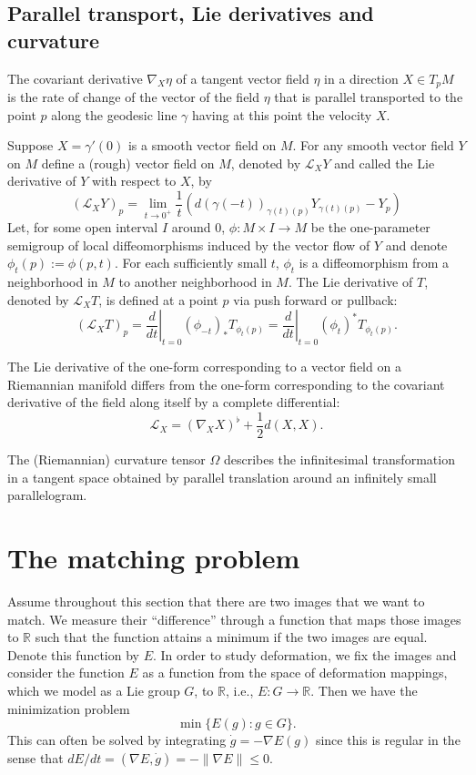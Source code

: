 \documentclass{article}
\theoremstyle{plain}
\theoremstyle{definition}
\numberwithin{equation}{section}
\newcommand{\R}{\ensuremath{\mathbb{R}}}
\newcommand{\lie}{\ensuremath{\mathcal{L}}}
\begin{document}
\subsection{Parallel transport, Lie derivatives and curvature}

The covariant derivative $\nabla_X\eta$ of a tangent vector field $\eta$ in a
direction $X\in T_pM$ is the rate of change of the vector of the field $\eta$ that is parallel transported to the point $p$ along the geodesic line $\gamma$ having at this point the velocity $X$.

Suppose $X=\gamma'(0)$ is a smooth vector field on $M$. %
For any smooth vector field $Y$ on $M$ define a (rough) vector field on $M$, denoted by $\lie_XY$ and called the Lie derivative of $Y$ with respect to $X$, by
\[
(\lie_XY)_p = \lim_{t\to 0^+}\frac{1}{t}\left(d(\gamma(-t))_{\gamma(t)(p)}Y_{\gamma(t)(p)}-Y_p\right)
\]
Let, for some open interval $I$ around $0$, $\phi : M \times I \to M$ be the one-parameter semigroup of local diffeomorphisms induced by the vector flow of $Y$ and denote $\phi_t(p) := \phi(p, t)$. For each sufficiently small $t$, $\phi_t$ is a diffeomorphism from a neighborhood in $M$ to another neighborhood in $M$. The Lie derivative of $T$, denoted by $\lie_XT$, is defined at a point $p$ via push forward or pullback: 
\[
(\lie_XT)_p = \left.\frac{d}{dt}\right|_{t=0} (\phi_{-t})_*T_{\phi_t(p)}=\left.\frac{d}{dt}\right|_{t=0} (\phi_{t})^*T_{\phi_t(p)}.
\]

The Lie derivative of the one-form corresponding to a vector
field on a Riemannian manifold differs from the one-form corresponding to the
covariant derivative of the field along itself by a complete differential:
\[
\lie_X=(\nabla_X X)^\flat +\frac{1}{2}d(X,X).
\]

The (Riemannian) curvature tensor $\Omega$ describes the infinitesimal
transformation in a tangent space obtained by parallel translation around an
infinitely small parallelogram.







\section{The matching problem}
Assume throughout this section that there are two images that we want to match. We measure their ``difference'' through a function that maps those images to $\R$ such that the function attains a minimum if the two images are equal. Denote this function by $E$. In order to study deformation, we fix the images and consider the function $E$ as a function from the space of deformation mappings, which we model as a Lie group $G$, to $\R$, i.e., $E:G\to \R$. Then we have the minimization problem
\[
\min \{E(g):g\in G\}.
\]
This can often be solved by integrating $\dot{g}=-\nabla E(g)$ since this is regular in the sense that $dE/dt=(\nabla E,\dot{g})=-\|\nabla E\|\leq 0$.
\end{document}
